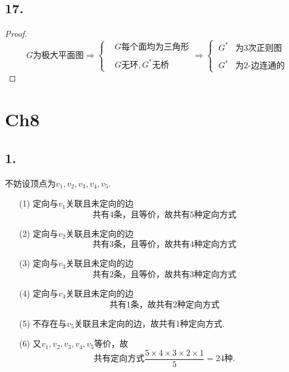 \documentclass{article}
\begin{document}
\subsection*{17.}
\begin{proof}
    \[
        G\mbox{为极大平面图}
        \Rightarrow
        \begin{cases}
            & G\mbox{每个面均为三角形}\\
            \\
            & G\mbox{无环}, G^*\mbox{无桥}
        \end{cases}
        \Rightarrow
        \begin{cases}
            \ G^* & \mbox{为3次正则图}\\
            \\
            \ G^* & \mbox{为2-边连通的}
        \end{cases}
    \]
\end{proof}

\clearpage
\section*{Ch8}
\subsection*{1.}
    不妨设顶点为$v_1, v_2 , v_3 , v_4 , v_5$.
    \begin{enumerate}
        \item [(1)]定向与$v_1$关联且未定向的边
        \[
            \mbox{共有4条，且等价，故共有5种定向方式}
        \]
        \item [(2)]定向与$v_2$关联且未定向的边
        \[
            \mbox{共有3条，且等价，故共有4种定向方式}
        \]
        \item [(3)]定向与$v_3$关联且未定向的边
        \[
            \mbox{共有2条，且等价，故共有3种定向方式}
        \]
        \item [(4)]定向与$v_4$关联且未定向的边
        \[
            \mbox{共有1条，故共有2种定向方式}
        \]
        \item [(5)]不存在与$v_5$关联且未定向的边，故共有1种定向方式.
        \item [(6)]又$v_1, v_2 , v_3 , v_4 , v_5$等价，故
        \[
            \mbox{共有定向方式}
            \displaystyle{\frac{5\times 4\times 3\times 2\times 1}{5}}
            =24\mbox{种}.
        \]
    \end{enumerate}
\end{document}

